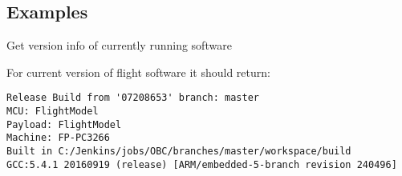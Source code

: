 \subsection{Examples}
Get version info of currently running \OBC software


For current version of flight software it should return:
\begin{verbatim}
Release Build from '07208653' branch: master
MCU: FlightModel
Payload: FlightModel
Machine: FP-PC3266
Built in C:/Jenkins/jobs/OBC/branches/master/workspace/build
GCC:5.4.1 20160919 (release) [ARM/embedded-5-branch revision 240496] 
\end{verbatim}

